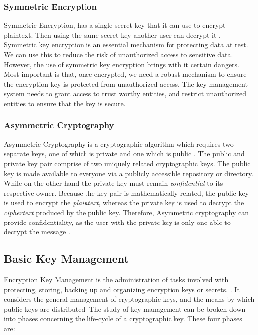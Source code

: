 \documentclass[11pt, a4paper, notitlepage]{article}
\begin{document}
\subsubsection*{Symmetric Encryption}
Symmetric Encryption, has a single secret key that it can use to encrypt plaintext. Then using the same secret key another user can decrypt it \cite{ferguson2003practical}. Symmetric key encryption is an essential mechanism for protecting data at rest. We can use this to reduce the risk of unauthorized access to sensitive data. However, the use of symmetric key encryption brings with it certain dangers. Most important is that, once encrypted, we need a robust mechanism to ensure the encryption key is protected from unauthorized access. The key management system needs to grant access to trust worthy entities, and restrict unauthorized entities to ensure that the key is secure. 

\subsubsection*{Asymmetric Cryptography}
Asymmetric Cryptography is a cryptographic algorithm which requires two separate keys, one of which is private and one which is public \cite{ferguson2003practical}.
The public and private key pair comprise of two uniquely related cryptographic keys. The public key is made available to everyone via a publicly accessible repository or directory. While on the other hand the private key must remain \emph{confidential} to its respective owner. Because the key pair is mathematically related, the public key is used to encrypt the \emph{plaintext}, whereas the private key is used to decrypt the \emph{ciphertext} produced by the public key. Therefore, Asymmetric cryptography can provide confidentiality, as the user with the private key is only one able to decrypt the message \cite{pub-key}.

\subsection*{Basic Key Management}
Encryption Key Management is the administration of tasks involved with protecting, storing, backing up and organizing encryption keys or secrets. \cite{defination:key-management}. It considers the general management of cryptographic keys, and the means by which public keys are distributed. The study of key management can be broken down into phases concerning the life-cycle of a cryptographic key. These four phases are: \\
\end{document}
